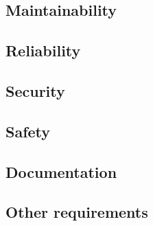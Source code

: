 \subsection{Maintainability}
\subsection{Reliability}
\subsection{Security}
\subsection{Safety}
\subsection{Documentation}
\subsection{Other requirements}
